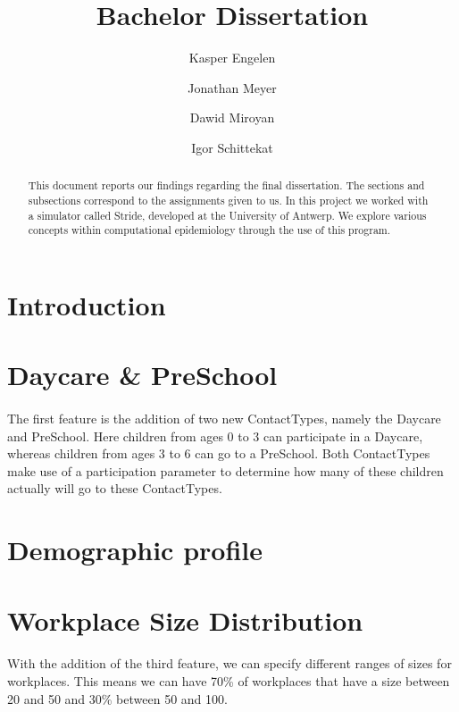 \documentclass[runningheads]{llncs}
\begin{document}
%
\title{Bachelor Dissertation}
%
%
\author{Kasper Engelen\and
		Jonathan Meyer\and
		Dawid Miroyan\and
		Igor Schittekat}
%
%
%
\maketitle              %
%
\begin{abstract}
This document reports our findings regarding the final dissertation. The sections and subsections correspond to the assignments given to us. In this project we worked with a simulator called Stride, developed at the University of Antwerp. We explore various concepts within computational epidemiology through the use of this program. 

\end{abstract}
%
%
%

\section{Introduction}


\section{Daycare \& PreSchool}
\paragraph{}
The first feature is the addition of two new ContactTypes, namely the Daycare and PreSchool. Here children from ages 0 to 3 can participate in a Daycare, whereas children from ages 3 to 6 can go to a PreSchool. Both ContactTypes make use of a participation parameter to determine how many of these children actually will go to these ContactTypes.


\section{Demographic profile}

\section{Workplace Size Distribution}
\paragraph{}
With the addition of the third feature, we can specify different ranges of sizes for workplaces. This means we can have 70\% of workplaces that have a size between 20 and 50 and 30\% between 50 and 100.
\end{document}
